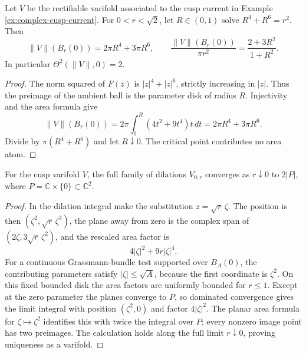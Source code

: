 \begin{proposition}\label{prop:cusp-density}
Let $V$ be the rectifiable varifold associated to the cusp current in Example \ref{ex:complex-cusp-current}. For $0<r<\sqrt2$, let $R\in(0,1)$ solve $R^4+R^6=r^2$. Then
\[
 \|V\|(B_r(0))=2\pi R^4+3\pi R^6,
 \qquad\frac{\|V\|(B_r(0))}{\pi r^2}
 =\frac{2+3R^2}{1+R^2}.
\]
In particular $\Theta^2(\|V\|,0)=2$.
\end{proposition}
\begin{proof}
The norm squared of $F(z)$ is $|z|^4+|z|^6$, strictly increasing in $|z|$. Thus the preimage of the ambient ball is the parameter disk of radius $R$. Injectivity and the area formula give
\[
 \|V\|(B_r(0))=2\pi\int_0^R(4t^2+9t^4)t\,dt
 =2\pi R^4+3\pi R^6.
\]
Divide by $\pi(R^4+R^6)$ and let $R\downarrow0$. The critical point contributes no area atom.
\end{proof}

\begin{proposition}\label{prop:cusp-tangent}
For the cusp varifold $V$, the full family of dilations $V_{0,r}$ converges as $r\downarrow0$ to $2|P|$, where $P=\mathbb C\times\{0\}\subset\mathbb C^2$.
\end{proposition}
\begin{proof}
In the dilation integral make the substitution $z=\sqrt r\,\zeta$. The position is then $(\zeta^2,\sqrt r\,\zeta^3)$, the plane away from zero is the complex span of $(2\zeta,3\sqrt r\,\zeta^2)$, and the rescaled area factor is
\[
 4|\zeta|^2+9r|\zeta|^4.
\]
For a continuous Grassmann-bundle test supported over $B_A(0)$, the contributing parameters satisfy $|\zeta|\leq\sqrt A$, because the first coordinate is $\zeta^2$. On this fixed bounded disk the area factors are uniformly bounded for $r\leq1$. Except at the zero parameter the planes converge to $P$, so dominated convergence gives the limit integral with position $(\zeta^2,0)$ and factor $4|\zeta|^2$. The planar area formula for $\zeta\mapsto\zeta^2$ identifies this with twice the integral over $P$; every nonzero image point has two preimages. The calculation holds along the full limit $r\downarrow0$, proving uniqueness as a varifold.
\end{proof}

